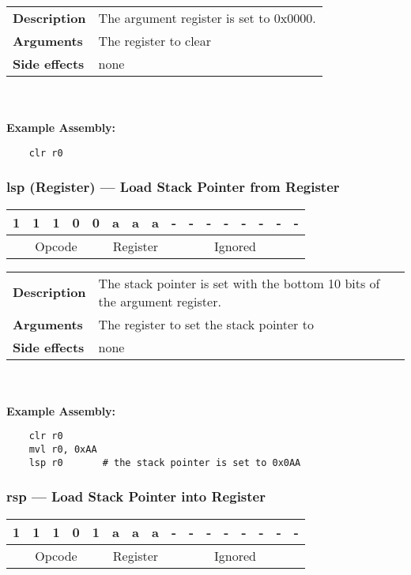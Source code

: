 \documentclass[titlepage]{article}
\begin{document}
\begin{tabular}{l p{8cm}}
{\bf Description} & The argument register is set to 0x0000. \\
{\bf Arguments} & The register to clear \\
{\bf Side effects} & none \\
\end{tabular}\\ \\
{\bf Example Assembly:}
\begin{verbatim}
    clr r0
\end{verbatim}

\subsubsection{lsp (Register) --- Load Stack Pointer from Register}\begin{center}
\begin{tabular}{|c|c|c|c|c|c|c|c|c|c|c|c|c|c|c|c|}
\hline
1 & 1 & 1 & 0 & 0 & a & a & a & - & - & - & - & - & - & - & - \\
\hline
\multicolumn{5}{|c}{Opcode} &
\multicolumn{3}{|c}{Register} &
\multicolumn{8}{|c|}{Ignored} \\
\hline
\end{tabular}
\end{center}

\begin{tabular}{l p{8cm}}
{\bf Description} & The stack pointer is set with the bottom 10 bits of the argument register. \\
{\bf Arguments} & The register to set the stack pointer to \\
{\bf Side effects} & none \\
\end{tabular}\\ \\
{\bf Example Assembly:}
\begin{verbatim}
    clr r0
    mvl r0, 0xAA
    lsp r0       # the stack pointer is set to 0x0AA
\end{verbatim}

\subsubsection{rsp --- Load Stack Pointer into Register}\begin{center}
\begin{tabular}{|c|c|c|c|c|c|c|c|c|c|c|c|c|c|c|c|}
\hline
1 & 1 & 1 & 0 & 1 & a & a & a & - & - & - & - & - & - & - & - \\
\hline
\multicolumn{5}{|c}{Opcode} &
\multicolumn{3}{|c}{Register} &
\multicolumn{8}{|c|}{Ignored} \\
\hline
\end{tabular}
\end{center}
\end{document}
